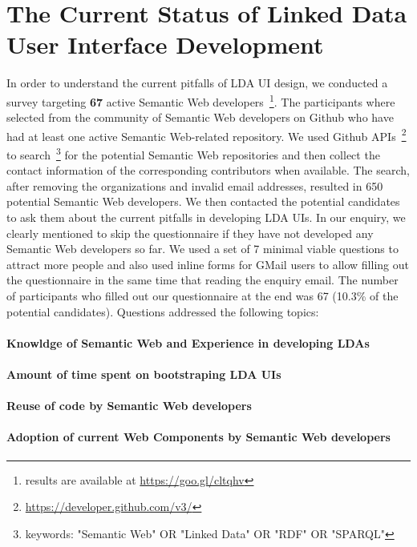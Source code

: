 \documentclass{acm_proc_article-sp}
\begin{document}
\section{The Current Status of Linked Data User Interface Development}
In order to understand the current pitfalls of LDA UI design, we conducted a survey targeting \textbf{67} active Semantic Web developers~\footnote{results are available at \url{https://goo.gl/cltqhv}}.
The participants where selected from the community of Semantic Web developers on Github who have had at least one active Semantic Web-related repository.
We used Github APIs~\footnote{\url{https://developer.github.com/v3/}} to search~\footnote{keywords: "Semantic Web" OR "Linked Data" OR "RDF" OR "SPARQL"} for the potential Semantic Web repositories and then collect the contact information of the corresponding contributors when available.
The search, after removing the organizations and invalid email addresses, resulted in 650 potential Semantic Web developers.
We then contacted the potential candidates to ask them about the current pitfalls in developing LDA UIs.
In our enquiry, we clearly mentioned to skip the questionnaire if they have not developed any Semantic Web developers so far.
We used a set of 7 minimal viable questions to attract more people and also used inline forms for GMail users to allow filling out the questionnaire in the same time that reading the enquiry email.
The number of participants who filled out our questionnaire at the end was 67 (10.3\% of the potential candidates).
Questions addressed the following topics:

\paragraph{Knowldge of Semantic Web and Experience in developing LDAs}

\paragraph{Amount of time spent on bootstraping LDA UIs}

\paragraph{Reuse of code by Semantic Web developers}

\paragraph{Adoption of current Web Components by Semantic Web developers}
\end{document}
